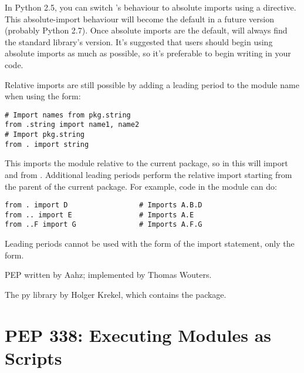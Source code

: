 \documentclass{howto}
\begin{document}
In Python 2.5, you can switch 's behaviour to 
absolute imports using a 
directive.  This absolute-import behaviour will become the default in
a future version (probably Python 2.7).  Once absolute imports 
are the default,  will
always find the standard library's version.
It's suggested that users should begin using absolute imports as much
as possible, so it's preferable to begin writing  in your code.  

Relative imports are still possible by adding a leading period 
to the module name when using the  form:

\begin{verbatim}
# Import names from pkg.string
from .string import name1, name2
# Import pkg.string
from . import string
\end{verbatim}

This imports the  module relative to the current
package, so in  this will import  and
 from .  Additional leading periods
perform the relative import starting from the parent of the current
package.  For example, code in the  module can do:

\begin{verbatim}
from . import D                 # Imports A.B.D
from .. import E                # Imports A.E
from ..F import G               # Imports A.F.G
\end{verbatim}

Leading periods cannot be used with the  
form of the import statement, only the  form.

\begin{seealso}

{PEP written by Aahz; implemented by Thomas Wouters.}

{The py library by Holger Krekel, which contains the  package.}

\end{seealso}


\section{PEP 338: Executing Modules as Scripts\label{pep-338}}
\end{document}
